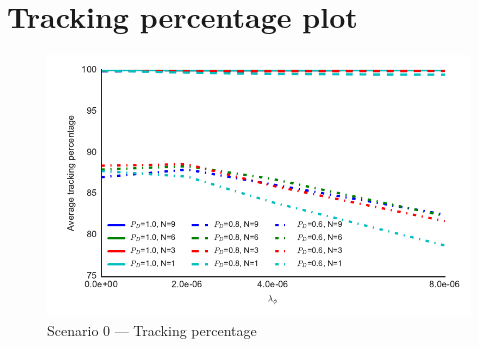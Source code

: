 
\chapter{Tracking percentage plot}

\begin{figure}[H]
\centering
\includegraphics{Figures/plots/Scenario0_Tracking-TrackingPercentage.pdf}
\caption{Scenario 0 --- Tracking percentage}\label{fig:scenario0_tracking_percentage}
\end{figure}

